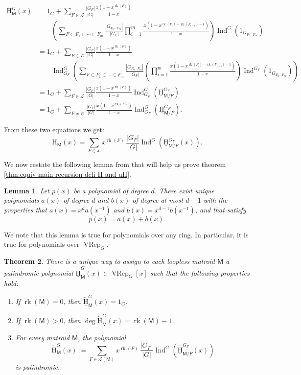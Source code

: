 \documentclass[11pt, a4paper, english]{amsart}
\theoremstyle{teoremas}
\newtheorem{theorem}{Theorem}[section]
\newtheorem{lemma}[theorem]{Lemma}
\theoremstyle{definition}
\DeclareMathOperator{\rk}{rk}
\newcommand{\M}{\mathsf{M}}
\renewcommand{\H}{\mathrm{H}}
\newcommand{\uH}{\underline{\mathrm{H}}}
\newcommand{\cL}{\mathcal{L}}
\newcommand{\VRep}{\operatorname{VRep}}
\newcommand{\Ind}{\operatorname{Ind}}
\begin{document}
\begin{align*}
    \H_{\M}^G(x) &= 1_G + \sum_{F\in\cL}\frac{|G_{F}|}{|G|}
        \frac{x(1-x^{\rk(F)})}{1-x}\\
        &\qquad\left(\sum_{F\subset F_1\subset \cdots \subset F_m}\frac{|G_{F_0\cdots F_m}|}{|G_F|}
        \prod_{i=1}^{m}{\frac{x(1-x^{\rk(F_i)-\rk(F_{i-1})-1})}{1-x}}\right)
        \Ind^G\left(1_{G_{F_0\cdots F_m}}\right)\\
        &= 1_G + \sum_{F\in\cL}\frac{|G_{F}|}{|G|}\frac{x(1-x^{\rk(F)})}{1-x}\\
        &\qquad
        \Ind^G_{G_F}\left(\sum_{F\subset F_1\subset \cdots \subset F_m}\frac{|G_{F_0\cdots F_m}|}{|G_F|}
        \left(\prod_{i=1}^{m}{\frac{x(1-x^{\rk(F_i)-\rk(F_{i-1})-1})}{1-x}}\right)
        \Ind^{G_F}\left(1_{G_{F_0\cdots F_m}}\right)\right)\\
        &= 1_G + \sum_{F\in\cL}\frac{|G_{F}|}{|G|}\frac{x(1-x^{\rk(F)})}{1-x}
        \Ind^G_{G_F}\left(\uH_{\M/F}^{G_F}\right)\\
        &= 1_G + \sum_{F\neq\varnothing}\frac{|G_{F}|}{|G|}\frac{x(1-x^{\rk(F)})}{1-x}
        \Ind^G_{G_F}\left(\uH_{\M/F}^{G_F}\right).
\end{align*}

From these two equations we get:
\[\H_\M(x) = \sum_{F\in\cL}x^{\rk(F)}\,\frac{|G_{F}|}{|G|}\Ind^G\left(\uH_{\M/F}^{G_F}(x)
\right).\]

We now restate the following lemma from \cite{fmsv24} that will help us prove
theorem \ref{thm:equiv-main-recursion-defi-H-and-uH}.

\begin{lemma}\label{lem:stapledon}
    Let $p(x)$ be a polynomial of degree $d$. There exist unique polynomials $a(x)$ of degree
$d$ and $b(x)$ of degree at most $d-1$ with the properties that $a(x)=x^d a(x^{-1})$ and
$b(x) = x^{d-1}b(x^{-1})$, and that satisfy
\[p(x)=a(x)+b(x).\]
\end{lemma}
We note that this lemma is true for polynomials over any ring. In particular,
it is true for polynomials over $\VRep_G$.

\begin{theorem}\label{thm:unique-equiv-main-recursion-defi-H-and-uH}
    There is a unique way to assign to each loopless matroid $\M$ a palindromic polynomial $\widetilde{\uH}_{\M}^G(x) \in \VRep_G[x]$ such that the following properties hold:
    \begin{enumerate}[\normalfont(i)]
        \item If $\rk(\M) = 0$, then $\widetilde{\uH}_{\M}^G(x) = 1_G$.
        \item If $\rk(\M) > 0$, then $\deg \widetilde{\uH}_{\M}^G(x) = \rk(\M) - 1$.
        \item For every matroid $\M$, the polynomial
            \[ \widetilde{\H}_{\M}^G(x) := \sum_{F\in \mathcal{L}(\M)} x^{\rk(F)}\, \frac{|G_F|}{|G|}\Ind^G\left(\widetilde{\uH}_{\M/F}^{G_F}(x)\right)\]
        is palindromic.
    \end{enumerate}
\end{theorem}
\end{document}
